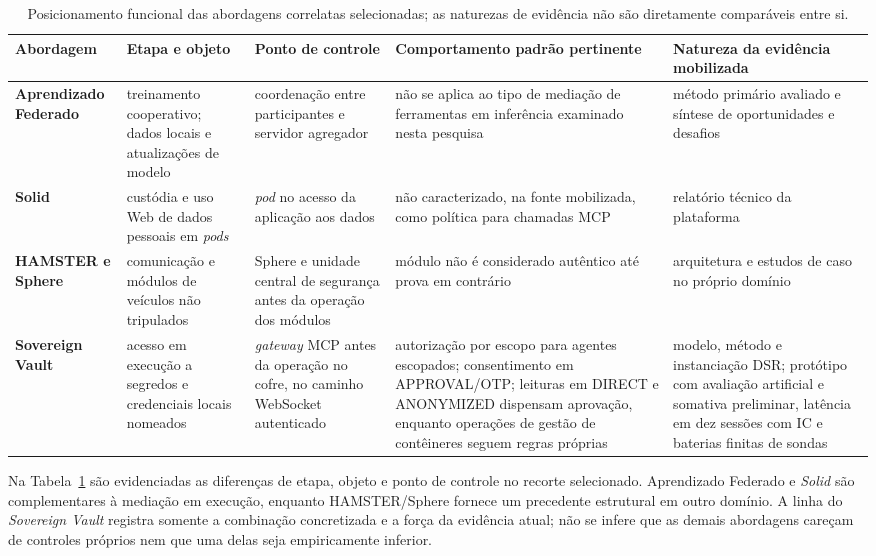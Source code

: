 \begin{table}[!htbp]
\centering
\scriptsize
\caption{Posicionamento funcional das abordagens correlatas selecionadas; as naturezas de evidência não são diretamente comparáveis entre si.}
\label{tab:posicionamento-correlatos}
\begin{tabularx}{\textwidth}{>{\raggedright\arraybackslash\bfseries}p{}>{\raggedright\arraybackslash}p{}>{\raggedright\arraybackslash}p{}>{\raggedright\arraybackslash}p{}X}
\toprule Abordagem & Etapa e objeto & Ponto de controle & Comportamento padrão pertinente & Natureza da evidência mobilizada \\ \midrule
Aprendizado Federado \cite{mcmahan2017,mammen2021} & treinamento cooperativo; dados locais e atualizações de modelo & coordenação entre participantes e servidor agregador & não se aplica ao tipo de mediação de ferramentas em inferência examinado nesta pesquisa & método primário avaliado e síntese de oportunidades e desafios \\
Solid \cite{sambra2016} & custódia e uso Web de dados pessoais em \textit{pods} & \textit{pod} no acesso da aplicação aos dados & não caracterizado, na fonte mobilizada, como política para chamadas MCP & relatório técnico da plataforma \\
HAMSTER e Sphere \cite{pigatto2016} & comunicação e módulos de veículos não tripulados & Sphere e unidade central de segurança antes da operação dos módulos & módulo não é considerado autêntico até prova em contrário & arquitetura e estudos de caso no próprio domínio \\
Sovereign Vault & acesso em execução a segredos e credenciais locais nomeados & \textit{gateway} MCP antes da operação no cofre, no caminho WebSocket autenticado & autorização por escopo para agentes escopados; consentimento em APPROVAL/OTP; leituras em DIRECT e ANONYMIZED dispensam aprovação, enquanto operações de gestão de contêineres seguem regras próprias & modelo, método e instanciação DSR; protótipo com avaliação artificial e somativa preliminar, latência em dez sessões com IC e baterias finitas de sondas \\
\bottomrule
\end{tabularx}
\end{table}

Na Tabela~\ref{tab:posicionamento-correlatos} são evidenciadas as diferenças de etapa, objeto e ponto de controle no recorte selecionado. Aprendizado Federado e \textit{Solid} são complementares à mediação em execução, enquanto HAMSTER/Sphere fornece um precedente estrutural em outro domínio. A linha do \textit{Sovereign Vault} registra somente a combinação concretizada e a força da evidência atual; não se infere que as demais abordagens careçam de controles próprios nem que uma delas seja empiricamente inferior.

